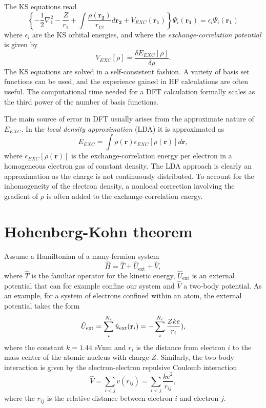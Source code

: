 The KS equations read
\begin{equation*}
  \left\{ -\frac{1}{2}\nabla_1^2 - \frac{Z}{r_1} + \int 
  \frac{\rho(\mathbf{r_2})}{r_{12}} d\mathbf{r_2} +
  V_{EXC}(\mathbf{r_1}) \right\} \Psi_i(\mathbf{r_1}) =
  \epsilon_i \Psi_i(\mathbf{r_1})
\end{equation*}
where $\epsilon_i$ are the KS orbital energies, and where the 
\emph{exchange-correlation potential} is given by
\begin{equation*}
  V_{EXC}[\rho] = \frac{\delta E_{EXC}[\rho]}{\delta \rho}.
\end{equation*}
The KS equations are solved in a self-consistent fashion. A variety of
basis set functions  can be used, and the experience gained in HF
calculations are often useful. The computational time needed for a DFT
calculation formally scales as the third power of the number of basis
functions. 

The main source of error in DFT usually arises from the approximate
nature of $E_{EXC}$. In the \emph{local density approximation} (LDA) it
is approximated as
\begin{equation*}
  E_{EXC} = \int \rho(\mathbf{r})\epsilon_{EXC}[\rho(\mathbf{r})]
  d\mathbf{r},
\end{equation*}
where $\epsilon_{EXC}[\rho(\mathbf{r})]$ is the exchange-correlation
energy per electron in a homogeneous electron gas of constant density.
The LDA approach is clearly an approximation as the charge is not
continuously distributed. To account for the inhomogeneity of the
electron density, a nonlocal correction involving the gradient of
$\rho$ is often added to the exchange-correlation energy.

\section{Hohenberg-Kohn theorem}
Assume a Hamiltonian of a many-fermion system
\[
\hat{H} = \hat{T}+\hat{U}_{\mathrm{ext}}+\hat{V},
\]
where $\hat{T}$ is the familiar operator for the kinetic energy, $\hat{U}_{\mathrm{ext}}$ is an external potential
that can for example confine our system and $\hat{V}$ a two-body potential. 
As an example, for a system of electrons confined within an atom, the external potential takes the form
\[
\hat{U}_{\mathrm{ext}}=\sum_i^{N_e}\hat{u}_{\mathrm{ext}}({\bf r}_i)=-\sum_i^{N_e}\frac{Zke}{r_i}),
\]
where the constant $k=1.44$ eVnm and $r_i$ is the distance from electron $i$ to the mass center of the atomic nucleus with charge $Z$. Similarly, the two-body interaction is  given by the electron-electron repulsive Coulomb interaction
\[
\hat{V}=\sum_{i < j} v(r_{ij})=\sum_{i < j} \frac{ke^2}{r_{ij}},
\]
where the $r_{ij}$ is the relative distance between electron $i$ and electron $j$.
